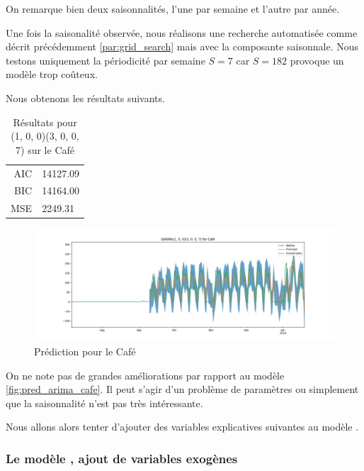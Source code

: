 On remarque bien deux saisonnalités, l'une par semaine et l'autre par année.

Une fois la saisonalité observée, nous réalisons une recherche automatisée comme décrit précédemment \ref{par:grid_search} mais avec la composante saisonnale. Nous testons uniquement la périodicité par semaine $S=7$ car $S=182$ provoque un modèle trop coûteux.

Nous obtenons les résultats suivants.

\begin{table}[ht]
    \centering
    \begin{tabular}{r|l}
        AIC & 14127.09 \\
        BIC & 14164.00 \\
        MSE &  2249.31 \\
    \end{tabular}
    \caption{Résultats pour \SARIMA(1, 0, 0)(3, 0, 0, 7) sur le Café}
    \label{tab:pred_sarima_cafe}
\end{table}

\begin{figure}[ht]
    \centering
    \includegraphics[width=\textwidth]{figures/pred_sarima_cafe.jpg}
    \caption{Prédiction \SARIMA pour le Café}
    \label{fig:pred_sarima_cafe}
\end{figure}

On ne note pas de grandes améliorations par rapport au modèle \ARIMA \ref{fig:pred_arima_cafe}. Il peut s'agir d'un problème de paramètres ou simplement que la saisonnalité n'est pas très intéressante.

Nous allons alors tenter d'ajouter des variables explicatives suivantes au modèle \SARIMAX.


\subsubsection{Le modèle \SARIMAX, ajout de variables exogènes}
\label{subsec:sarimax}

